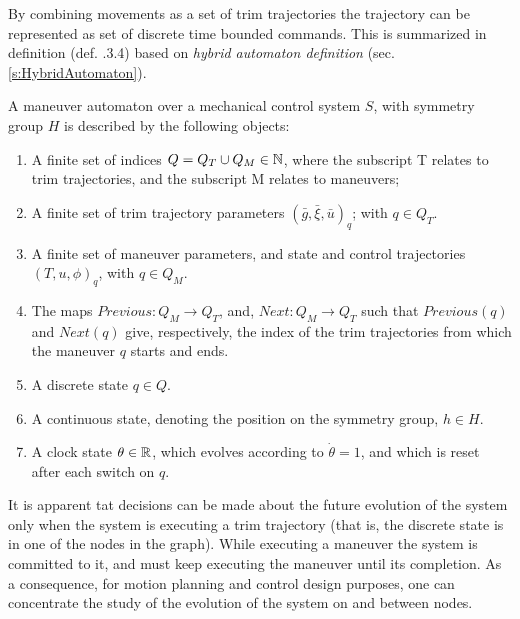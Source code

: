 By combining movements as a set of trim trajectories the trajectory can be represented as set of discrete time bounded commands. This is summarized in definition (def. \cite{frazzoli2001robust}.3.4) based on \emph{hybrid automaton definition} (sec. \ref{s:HybridAutomaton}).
\begin{definition} A maneuver automaton over a mechanical control system $S$, with symmetry group $H$ is described by the following objects:

\begin{enumerate}
    \item A finite set of indices $Q = Q_T \cup Q_M \in \mathbb{N}$, where the subscript T relates to trim trajectories, and the subscript M relates to maneuvers;
    
    \item A finite set of trim trajectory parameters $\left(\bar{g},\bar{\xi},\bar{u}\right)_q$; with $q\in Q_T$.
    
    \item A finite set of maneuver parameters, and state and control trajectories $\left(T,u,\phi\right)_q$, with $q\in Q_M$.
    
    \item The maps $Previous: Q_M\to Q_T $, and, $Next: Q_M \to Q_T$ such that $Previous(q)$ and $Next(q)$ give, respectively, the index of the trim trajectories from which the maneuver $q$ starts and ends.
    
    \item A discrete state $q \in Q$.
    
    \item A continuous state, denoting the position on the symmetry group, $h \in H$.
    
    \item A clock state $\theta \in \mathbb{R}$, which evolves according to $\dot{\theta}=1$, and which is reset after each switch on $q$.
\end{enumerate}
\begin{note}
    It is apparent tat decisions can be made about the future evolution of the system only when the system is executing a trim trajectory (that is, the discrete state is in one of the nodes in the graph). While executing a maneuver the system is committed to it, and must keep executing the maneuver until its completion. As a consequence, for motion planning and control design purposes, one can concentrate the study of the evolution of the system on and between nodes.
\end{note}
\end{definition}